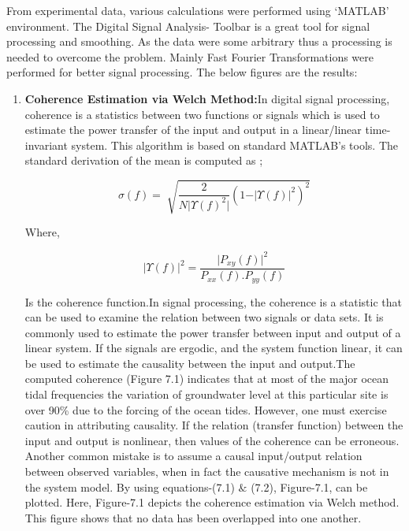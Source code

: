 From experimental data, various calculations were performed using ‘MATLAB’ environment. The Digital Signal Analysis- Toolbar is a great tool for signal processing and smoothing. As the data were some arbitrary thus a processing is needed to overcome the problem. Mainly Fast Fourier Transformations were performed for better signal processing. The below figures are the results:
\begin{enumerate}[label=\roman*]
\setlength{\parskip}{0.0pt}
\item \textbf{Coherence Estimation via Welch Method:}In digital signal processing, coherence is a statistics between two functions or
signals which is used to estimate the power transfer of the input and output in a linear/linear time-invariant system. This algorithm is based on standard MATLAB’s tools. The standard derivation of the mean is computed as \cite{sethi2017internet,tsang2017iot,zawawi2018electromyography,gres2019orthogonal,regalia2018adaptive,de2013inverse,cohen2018automated,van2018signal,anchal2018nonlinearity,seichter2018online,lewicki2009eddy,hijazi2018ambient};\par


\begin{equation}\tag{7.1}
 \sigma  ( f ) = \sqrt[]{\frac{2}{N \vert  \Upsilon  ( f ) ^{2} \vert } ( 1- \vert  \Upsilon  ( f )  \vert ^{2} ) ^{2}}
\end{equation}
\begin{justify}
Where,
\end{justify}


\begin{equation}\tag{7.2}
 \vert  \Upsilon  ( f )  \vert ^{2}= \frac{ \vert P_{xy} ( f )  \vert ^{2}}{P_{xx} ( f ) .P_{yy} ( f ) }
\end{equation}
\begin{justify}
Is the coherence function.In signal processing, the coherence is a statistic that can be used to examine the relation between two signals or data sets. It is commonly used to estimate the power transfer between input and output of a linear system. If the signals are ergodic, and the system function linear, it can be used to estimate the causality between the input and output.The computed coherence (Figure 7.1) indicates that at most of the major ocean tidal frequencies the variation of groundwater level at this particular site is over 90\% due to the forcing of the ocean tides. However, one must exercise caution in attributing causality. If the relation (transfer function) between the input and output is nonlinear, then values of the coherence can be erroneous. Another common mistake is to assume a causal input/output relation between observed variables, when in fact the causative mechanism is not in the system model. By using equations-(7.1) $\&$  (7.2), Figure-7.1, can be plotted. Here, Figure-7.1 depicts the coherence estimation via Welch method. This figure shows that no data has been overlapped into one another.
\end{justify}


\end{enumerate}
